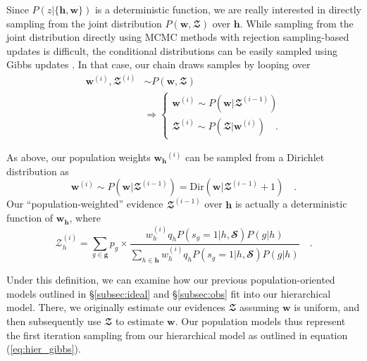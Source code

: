 \documentclass[a4paper,fleqn,usenatbib,english]{mnras}
\begin{document}
Since $P(z|\lbrace \mathbf{h}, \mathbf{w} \rbrace)$ is a deterministic function, we are really interested in directly sampling from the joint distribution $P(\mathbf{w},\mathbfcal{Z})$ over $\mathbf{h}$. While sampling from the joint distribution directly using MCMC methods with rejection sampling-based updates \citep[e.g., standard Metropolis-Hastings updates;][]{metropolis+53,hastings70} is difficult, the conditional distributions can be easily sampled using Gibbs updates \citep{gemangeman84}. In that case, our chain draws samples by looping over
\begin{align}
\mathbf{w}^{(i)},\mathbfcal{Z}^{(i)} &\sim P(\mathbf{w},\mathbfcal{Z}) \nonumber \\
&\Rightarrow
\begin{cases}
\mathbf{w}^{(i)} \sim P(\mathbf{w}|\mathbfcal{Z}^{(i-1)}) \\
\mathbfcal{Z}^{(i)} \sim P(\mathbfcal{Z}|\mathbf{w}^{(i)}) \quad .
\end{cases} \label{eq:hier_gibbs}
\end{align}


As above, our population weights $\mathbf{w_h}^{(i)}$ can be sampled from a Dirichlet distribution as
\begin{equation}
\mathbf{w}^{(i)} \sim P(\mathbf{w}|\mathbfcal{Z}^{(i-1)}) = \mathrm{Dir}(\mathbf{w}|\mathbfcal{Z}^{(i-1)}+1) \quad . \nonumber
\end{equation}
Our ``population-weighted'' evidence $\mathbfcal{Z}^{(i-1)}$ over $\mathbf{h}$ is actually a deterministic function of $\mathbf{w_h}$, where
\begin{equation}
\mathcal{Z}_h^{(i)} = \sum_{g \in \mathbf{g}} p_g \times \frac{w_h^{(i)} q_h P(s_g=1|h,\mathbfcal{S}) P(g|h)}{\sum_{h \in \mathbf{h}} w_h^{(i)} q_h P(s_g=1|h,\mathbfcal{S}) P(g|h)} \quad . \label{eq:evidence3}
\end{equation}

Under this definition, we can examine how our previous population-oriented models outlined in \S\ref{subsec:ideal} and \S\ref{subsec:obs} fit into our hierarchical model. There, we originally estimate our evidences $\mathbfcal{Z}$ assuming $\mathbf{w}$ is uniform, and then subsequently use $\mathbfcal{Z}$ to estimate $\mathbf{w}$. Our population models thus represent the first iteration sampling from our hierarchical model as outlined in equation (\ref{eq:hier_gibbs}).
\end{document}
